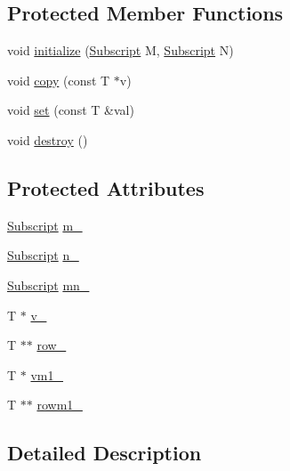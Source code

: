 \subsection*{Protected Member Functions}
\begin{DoxyCompactItemize}
\item 
void \hyperlink{classTNT_1_1Matrix_abc963d455626c3f0a170b2df8d40c39a}{initialize} (\hyperlink{namespaceTNT_af22e3f1460e145c04ce4e7d701e4c1c1}{Subscript} M, \hyperlink{namespaceTNT_af22e3f1460e145c04ce4e7d701e4c1c1}{Subscript} N)
\item 
void \hyperlink{classTNT_1_1Matrix_ab14f23495e591b50b73574e154a178a7}{copy} (const T $\ast$v)
\item 
void \hyperlink{classTNT_1_1Matrix_a9bafeab51d069cf4bf310540e0a05df6}{set} (const T \&val)
\item 
void \hyperlink{classTNT_1_1Matrix_a44f6121414c93eb548b0bd82a03e7ecc}{destroy} ()
\end{DoxyCompactItemize}
\subsection*{Protected Attributes}
\begin{DoxyCompactItemize}
\item 
\hyperlink{namespaceTNT_af22e3f1460e145c04ce4e7d701e4c1c1}{Subscript} \hyperlink{classTNT_1_1Matrix_a72e92c4629de6a79ac12a1039f461b6f}{m\+\_\+}
\item 
\hyperlink{namespaceTNT_af22e3f1460e145c04ce4e7d701e4c1c1}{Subscript} \hyperlink{classTNT_1_1Matrix_ab7dc73d05542cc97be2280a50ac1374c}{n\+\_\+}
\item 
\hyperlink{namespaceTNT_af22e3f1460e145c04ce4e7d701e4c1c1}{Subscript} \hyperlink{classTNT_1_1Matrix_a1211bb821e4b22be124e16b1123f769c}{mn\+\_\+}
\item 
T $\ast$ \hyperlink{classTNT_1_1Matrix_a6a7ca17d4336b010fbde3036bbe54093}{v\+\_\+}
\item 
T $\ast$$\ast$ \hyperlink{classTNT_1_1Matrix_a9b970ee02290aa814d67ca6e8a4ebc60}{row\+\_\+}
\item 
T $\ast$ \hyperlink{classTNT_1_1Matrix_a7bee192ea8a850399382ff79c9d176bf}{vm1\+\_\+}
\item 
T $\ast$$\ast$ \hyperlink{classTNT_1_1Matrix_a099ebf68bd8eb98cda5844ca99dbf614}{rowm1\+\_\+}
\end{DoxyCompactItemize}


\subsection{Detailed Description}
